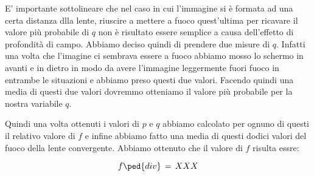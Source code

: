 E' importante sottolineare che nel caso in cui l'immagine si è formata ad una certa distanza dlla lente, riuscire a mettere a fuoco quest'ultima per ricavare il valore più probabile di $q$ non è risultato essere semplice a causa dell'effetto di profondità di campo. Abbiamo deciso quindi di prendere due misure di $q$. Infatti una volta che l'imagine ci sembrava essere a fuoco abbiamo mosso lo schermo in avanti e in dietro in modo da avere l'immagine leggermente fuori fuoco in entrambe le situazioni e abbiamo preso questi due valori. Facendo quindi una media di questi due valori dovremmo otteniamo il valore più probabile per la nostra variabile $q$.

Quindi una volta ottenuti i valori  di $p$ e $q$ abbiamo calcolato per ognuno di questi il relativo valore di $f$ e infine abbiamo fatto una media di questi dodici valori del fuoco della lente convergente.
Abbiamo ottenuto che il valore di $f$ risulta essre:

\begin{equation}
	f \ped{div} \,=\, XXX
\end{equation}











